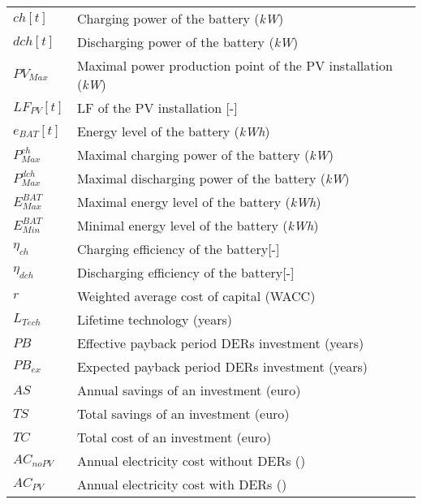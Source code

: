 \documentclass[master=ene,english]{kulemt}
\begin{document}
\begin{flushleft}
\begin{tabularx}{\textwidth}{@{}p{12mm}X@{}}
    $ch[t]$ & Charging power of the battery (\textit{kW})\\
    $dch[t]$ & Discharging power of the battery (\textit{kW})\\
    $PV_{Max}$ & Maximal power production point of the PV installation (\textit{kW})\\
    $LF_{PV}[t]$ & LF of the PV installation [-]\\
    $e_{BAT}[t]$ & Energy level of the battery (\textit{kWh})\\
    $P_{Max}^{ch}$ & Maximal charging power of the battery (\textit{kW})\\
    $P_{Max}^{dch}$ & Maximal discharging power of the battery (\textit{kW})\\
    $E_{Max}^{BAT}$ & Maximal energy level of the battery (\textit{kWh})\\
    $E_{Min}^{BAT}$ & Minimal energy level of the battery (\textit{kWh})\\
    $\eta_{ch}$ & Charging efficiency of the battery[-]\\
    $\eta_{dch}$ & Discharging efficiency of the battery[-]\\
    $r$ & Weighted average cost of capital (WACC)\\
    $L_{Tech}$ & Lifetime technology (years)\\
    $PB$ & Effective payback period DERs investment (years)\\
    $PB_{ex}$ & Expected payback period DERs investment (years)\\
    $AS$ & Annual savings of an investment (euro)\\
    $TS$ & Total savings of an investment (euro)\\
    $TC$ & Total cost of an investment (euro)\\
    $AC_{noPV}$ & Annual electricity cost without DERs (\EUR{})\\
    $AC_{PV}$ & Annual electricity cost with DERs (\EUR{})
    \\
  \end{tabularx}
\end{flushleft}

\mainmatter




    
    

\appendixpage*          %
\appendix
%




\backmatter


\end{document}
